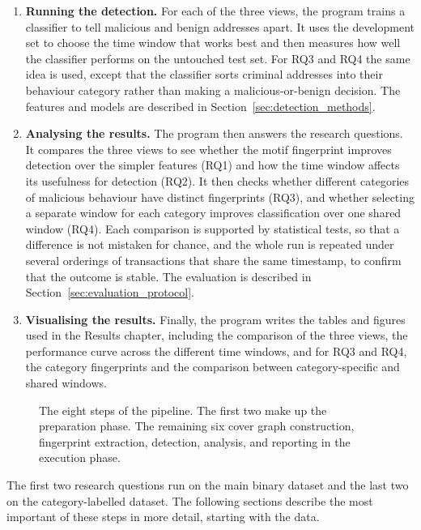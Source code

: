 \begin{enumerate}
  \item \textbf{Running the detection.} For each of the three views, the program
        trains a classifier to tell malicious and benign addresses apart. It
        uses the development set to choose the time window that works best and
        then measures how well the classifier performs on the untouched test
        set. For RQ3 and RQ4 the same idea is used, except that the classifier
        sorts criminal addresses into their behaviour category rather than making
        a malicious-or-benign decision. The features and models are described in
        Section~\ref{sec:detection_methods}.

  \item \textbf{Analysing the results.} The program then answers the research
        questions. It compares the three views to see whether the motif
        fingerprint improves detection over the simpler features (RQ1) and how
        the time window affects its usefulness for detection (RQ2). It then checks
        whether different categories of malicious behaviour have distinct
        fingerprints (RQ3), and whether selecting a separate window for each
        category improves classification over one shared window (RQ4). Each comparison is
        supported by statistical tests, so that a difference is not mistaken for
        chance, and the whole run is repeated under several orderings of
        transactions that share the same timestamp, to confirm that the outcome
        is stable. The evaluation is described in
        Section~\ref{sec:evaluation_protocol}.

  \item \textbf{Visualising the results.} Finally, the program writes the tables
        and figures used in the Results chapter, including the comparison of the
        three views, the performance curve across the different time windows, and
        for RQ3 and RQ4, the category fingerprints and the comparison between
        category-specific and shared windows.
\end{enumerate}

\begin{figure}[p]
  \centering
  \caption{The eight steps of the pipeline. The first two make up the preparation
  phase. The remaining six cover graph construction, fingerprint extraction,
  detection, analysis, and reporting in the execution phase.}
  \label{fig:method_steps}
\end{figure}

The first two research questions run on the main binary dataset and the last two
on the category-labelled dataset. The following sections describe the most
important of these steps in more detail, starting with the data.

